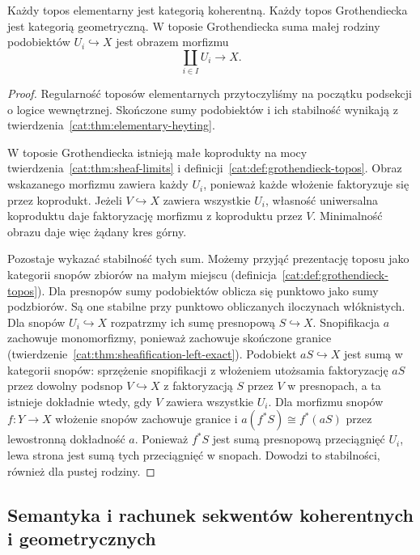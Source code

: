 \begin{stwierdzenie}\label{cat:prop:cl-topos-geometric-category}
Każdy topos elementarny jest kategorią koherentną. Każdy topos Grothendiecka jest kategorią geometryczną. W toposie Grothendiecka suma małej rodziny podobiektów $U_i\hookrightarrow X$ jest obrazem morfizmu
\[
 \coprod_{i\in I}U_i\longrightarrow X.
\]
\end{stwierdzenie}
\begin{proof}
Regularność toposów elementarnych przytoczyliśmy na początku podsekcji o logice wewnętrznej. Skończone sumy podobiektów i ich stabilność wynikają z twierdzenia~\ref{cat:thm:elementary-heyting}.

W toposie Grothendiecka istnieją małe koprodukty na mocy twierdzenia~\ref{cat:thm:sheaf-limits} i definicji~\ref{cat:def:grothendieck-topos}. Obraz wskazanego morfizmu zawiera każdy $U_i$, ponieważ każde włożenie faktoryzuje się przez koprodukt. Jeżeli $V\hookrightarrow X$ zawiera wszystkie $U_i$, własność uniwersalna koproduktu daje faktoryzację morfizmu z koproduktu przez $V$. Minimalność obrazu daje więc żądany kres górny.

Pozostaje wykazać stabilność tych sum. Możemy przyjąć prezentację toposu jako kategorii snopów zbiorów na małym miejscu (definicja~\ref{cat:def:grothendieck-topos}). Dla presnopów sumy podobiektów oblicza się punktowo jako sumy podzbiorów. Są one stabilne przy punktowo obliczanych iloczynach włóknistych. Dla snopów $U_i\hookrightarrow X$ rozpatrzmy ich sumę presnopową $S\hookrightarrow X$. Snopifikacja $a$ zachowuje monomorfizmy, ponieważ zachowuje skończone granice (twierdzenie~\ref{cat:thm:sheafification-left-exact}). Podobiekt $aS\hookrightarrow X$ jest sumą w kategorii snopów: sprzężenie snopifikacji z włożeniem utożsamia faktoryzację $aS$ przez dowolny podsnop $V\hookrightarrow X$ z faktoryzacją $S$ przez $V$ w presnopach, a ta istnieje dokładnie wtedy, gdy $V$ zawiera wszystkie $U_i$. Dla morfizmu snopów $f:Y\to X$ włożenie snopów zachowuje granice i $a(f^*S)\cong f^*(aS)$ przez lewostronną dokładność $a$. Ponieważ $f^*S$ jest sumą presnopową przeciągnięć $U_i$, lewa strona jest sumą tych przeciągnięć w snopach. Dowodzi to stabilności, również dla pustej rodziny.
\end{proof}

\subsection{Semantyka i rachunek sekwentów koherentnych i geometrycznych}

